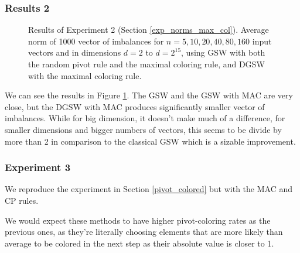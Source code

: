\documentclass[12pt]{article}
\begin{document}
\subsubsection{Results 2}
\begin{figure}[h!]
\centering

\caption{Results of Experiment 2 (Section \ref{exp_norms_max_col}). Average norm of 1000 vector of imbalances for $n=5,10,20,40,80,160$ input vectors and in dimensions $d=2$ to $d=2^{15}$, using GSW with both the random pivot rule and the maximal coloring rule, and DGSW with the maximal coloring rule.}
\label{results_plot_max_col_norms}
\end{figure}
We can see the results in Figure \ref{results_plot_max_col_norms}. The GSW and the GSW with MAC are very close, but the DGSW with MAC produces significantly smaller vector of imbalances. While for big dimension, it doesn't make much of a difference, for smaller dimensions and bigger numbers of vectors, this seems to be divide by more than 2 in comparison to the classical GSW which is a sizable improvement.

\subsubsection{Experiment 3}\label{pivot_colored_coloring_rules}
We reproduce the experiment in Section \ref{pivot_colored} but with the MAC and CP rules.

We would expect these methods to have higher pivot-coloring rates as the previous ones, as they're literally choosing elements that are more likely than average to be colored in the next step as their absolute value is closer to 1.
\end{document}
